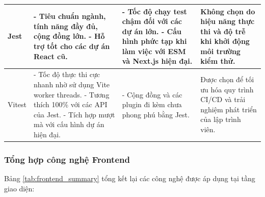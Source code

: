 \begin{center}
\begin{longtable}{|p{2.5cm}|p{4cm}|p{4cm}|p{3.5cm}|}
        Jest                                                             &
        - Tiêu chuẩn ngành, tính năng đầy đủ, cộng đồng lớn. \newline
        - Hỗ trợ tốt cho các dự án React cũ.                             &
        - Tốc độ chạy test chậm đối với các dự án lớn. \newline
        - Cấu hình phức tạp khi làm việc với ESM và Next.js hiện đại.    &
        Không chọn do hiệu năng thực thi và độ trễ khi khởi động môi trường kiểm thử.                                                                                                    \\ \hline

        Vitest                                                           &
        - Tốc độ thực thi cực nhanh nhờ sử dụng Vite worker threads. \newline
        - Tương thích 100\% với các API của Jest. \newline
        - Tích hợp mượt mà với cấu hình dự án hiện đại.                  &
        - Cộng đồng và các plugin đi kèm chưa phong phú bằng Jest.       &
        Được chọn để tối ưu hóa quy trình CI/CD và trải nghiệm phát triển của lập trình viên.                                                                                            \\ \hline
    \end{longtable}
\end{center}

\subsubsection{Tổng hợp công nghệ Frontend}

Bảng \ref{tab:frontend_summary} tổng kết lại các công nghệ được áp dụng tại tầng giao diện:

